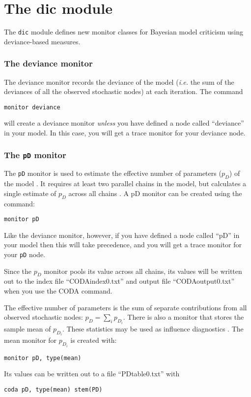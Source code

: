 \documentclass[11pt, a4paper, titlepage]{report}
\begin{document}
\chapter{The dic module}

The \verb+dic+ module defines new monitor classes for Bayesian model
criticism using deviance-based measures. 

\subsection{The deviance monitor}

The deviance monitor records the deviance of the model ({\em i.e.} the
sum of the deviances of all the observed stochastic nodes) at each
iteration. The command
\begin{verbatim}
monitor deviance
\end{verbatim}
will create a deviance monitor {\em unless} you have defined a node
called ``deviance'' in your model. In this case, you will get a trace
monitor for your deviance node.

\subsection{The \texttt{pD} monitor}

The \verb+pD+ monitor is used to estimate the effective number of
parameters ($p_D$) of the model \cite{spiegelhalter:etal:2002}. It
requires at least two parallel chains in the model, but calculates
a single estimate of $p_D$ across all chains \cite{plummer:2002}.
A pD monitor can be created using the command:
\begin{verbatim}
monitor pD
\end{verbatim}
Like the deviance monitor, however, if you have defined a node called
``pD'' in your model then this will take precedence, and you will get
a trace monitor for your \verb+pD+ node.

Since the $p_D$ monitor pools its value across all chains, its values
will be written out to the index file ``CODAindex0.txt'' and
output file ``CODAoutput0.txt'' when you use the CODA command.

The effective number of parameters is the sum of separate contributions
from all observed stochastic nodes: $p_D = \sum_i p_{D_i}$. There is
also a monitor that stores the sample mean of $p_{D_i}$. These statistics
may be used as influence diagnostics \cite{spiegelhalter:etal:2002}.
The mean monitor for $p_{D_i}$ is created with:
\begin{verbatim}
monitor pD, type(mean)
\end{verbatim}
Its values can be written out to a file ``PDtable0.txt'' with
\begin{verbatim}
coda pD, type(mean) stem(PD)
\end{verbatim}
\end{document}

